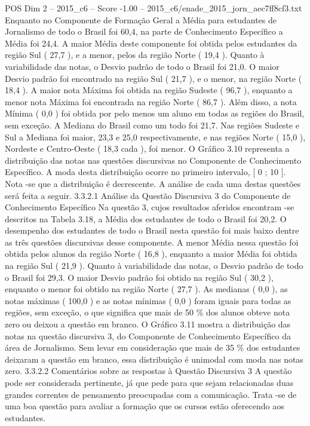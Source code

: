 \begin{textsample}{POS Dim 2 – 2015\_c6 – Score -1.00 – 2015\_c6/enade\_2015\_jorn\_aec7ff8cf3.txt}
Enquanto no Componente de Formação Geral a Média para estudantes de Jornalismo de todo o Brasil foi 60,4, na parte de Conhecimento Específico a Média foi 24,4.
A maior Média deste componente foi obtida pelos estudantes da região Sul ( 27,7 ), e a menor, pelos da região Norte ( 19,4 ).
Quanto à variabilidade das notas, o Desvio padrão de todo o Brasil foi 21,0.
O maior Desvio padrão foi encontrado na região Sul ( 21,7 ), e o menor, na região Norte ( 18,4 ).
A maior nota Máxima foi obtida na região Sudeste ( 96,7 ), enquanto a menor nota Máxima foi encontrada na região Norte ( 86,7 ).
Além disso, a nota Mínima ( 0,0 ) foi obtida por pelo menos um aluno em todas as regiões do Brasil, sem exceção.
A Mediana do Brasil como um todo foi 21,7.
Nas regiões Sudeste e Sul a Mediana foi maior, 23,3 e 25,0 respectivamente, e nas regiões Norte ( 15,0 ), Nordeste e Centro-Oeste ( 18,3 cada ), foi menor.
O Gráfico 3.10 representa a distribuição das notas nas questões discursivas no Componente de Conhecimento Específico.
A moda desta distribuição ocorre no primeiro intervalo, [ 0 ; 10 ].
Nota -se que a distribuição é decrescente.
A análise de cada uma destas questões será feita a seguir. 3.3.2.1 Análise da Questão Discursiva 3 do Componente de Conhecimento Específico Na questão 3, cujos resultados aferidos encontram -se descritos na Tabela 3.18, a Média dos estudantes de todo o Brasil foi 20,2.
O desempenho dos estudantes de todo o Brasil nesta questão foi mais baixo dentre as três questões discursivas desse componente.
A menor Média nessa questão foi obtida pelos alunos da região Norte ( 16,8 ), enquanto a maior Média foi obtida na região Sul ( 21,9 ).
Quanto à variabilidade das notas, o Desvio padrão de todo o Brasil foi 29,3.
O maior Desvio padrão foi obtido na região Sul ( 30,2 ), enquanto o menor foi obtido na região Norte ( 27,7 ).
As medianas ( 0,0 ), as notas máximas ( 100,0 ) e as notas mínimas ( 0,0 ) foram iguais para todas as regiões, sem exceção, o que significa que mais de 50 \% dos alunos obteve nota zero ou deixou a questão em branco.
O Gráfico 3.11 mostra a distribuição das notas na questão discursiva 3, do Componente de Conhecimento Específico da área de Jornalismo.
Sem levar em consideração que mais de 35 \% dos estudantes deixaram a questão em branco, essa distribuição é unimodal com moda nas notas zero. 3.3.2.2 Comentários sobre as respostas à Questão Discursiva 3 A questão pode ser considerada pertinente, já que pede para que sejam relacionadas duas grandes correntes de pensamento preocupadas com a comunicação.
Trata -se de uma boa questão para avaliar a formação que os cursos estão oferecendo aos estudantes.

\end{textsample}
